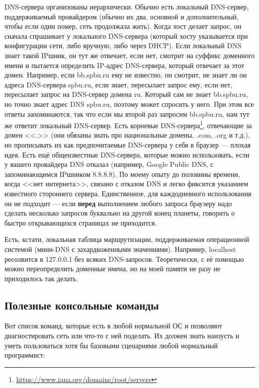 \documentclass[a5paper]{article}
\begin{document}
DNS-сервера организованы иерархически. Обычно есть локальный DNS-сервер, поддерживаемый провайдером (обычно их два, основной и дополнительный, чтобы если один помер, сеть продолжала жить). Когда хост делает запрос, он сначала спрашивает у локального DNS-сервера (который хосту указывается при конфигурации сети, либо вручную, либо через DHCP). Если локальный DNS знает такой IPшник, он тут же отвечает, если нет, смотрит на суффикс доменного имени и пытается определить IP-адрес DNS-сервера, который отвечает за этот домен. Например, если bb.spbu.ru ему не известно, он смотрит, не знает ли он адреса DNS-сервера spbu.ru, если знает, пересылает запрос ему, если нет, пересылает запрос на DNS-сервер домена ru. Который сам не знает bb.spbu.ru, но точно знает адрес DNS spbu.ru, поэтому может спросить у него. При этом все ответы запоминаются, так что если мы второй раз запросим bb.spbu.ru, нам тут же ответит локальный DNS-сервер. Есть корневые DNS-сервера\footnote{\url{https://www.iana.org/domains/root/servers}}, отвечающие за домен <<.>> (они обязаны знать про национальные домены, .com, .org и т.д.), но прописывать их как предпочитаемые DNS-сервера у себя в браузер --- плохая идея. Есть ещё общеизвестные DNS-сервера, которые можно использовать, если у вашего провайдера DNS отказал (например, Google Public DNS, с запоминающимся IPшником 8.8.8.8). По моему опыту до половины времени, когда <<нет интернета>>, связано с отказом DNS и легко фиксится указанием известного стороннего сервера. Единственное, для каждодневного использования он не подходит --- если \textbf{перед} выполнением любого запроса браузеру надо сделать несколько запросов буквально на другой конец планеты, говорить о быстро открывающихся страницах не приходится.

Есть, кстати, локальная таблица маршрутизации, поддерживаемая операционной системой (мини-DNS с захардкоженными значениями). Например, localhost ресолвится в 127.0.0.1 без всяких DNS-запросов. Теоретически, с её помощью можно переопределить доменные имена, но на моей памяти не разу не приходилось так делать.

\subsection{Полезные консольные команды}

Вот список команд, которые есть в любой нормальной ОС и позволяют диагностировать сеть или что-то с ней поделать. Их должен знать наизусть и уметь пользоваться хотя бы базовыми сценариями любой нормальный программист:
\end{document}
